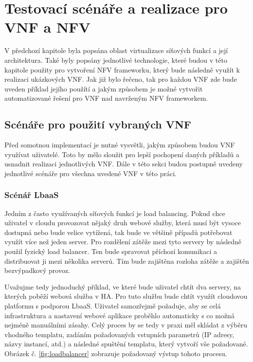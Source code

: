\chapter{Testovací scénáře a realizace pro VNF a NFV}

V předchozí kapitole byla popsána oblast virtualizace síťových funkcí a její architektura. Také byly popsány jednotlivé technologie, které budou v této kapitole použity pro vytvoření NFV frameworku, který bude následně využít k realizaci ukázkových VNF. Jak již bylo řečeno, tak pro každou VNF zde bude uveden příklad jejího použítí a jakým způsobem je možné vytvořit automatizované řešení pro VNF nad navrženým NFV frameworkem.

\section{Scénáře pro použití vybraných VNF}

Před somotnou implementací je nutné vysvětli, jakým způsobem budou VNF využívat uživatelé. Toto by mělo sloužit pro lepší pochopení daných příkladů a usnadnit realizaci jednotlivých VNF. Dále v této sekci budou postupně uvedeny jednotlivé scénáře pro všechna uvedené VNF v této práci. 

\subsection{Scénář LbaaS}

Jedním z často využívaných síťových funkcí je load balancing. Pokud chce uživatel v cloudu provozovat nějaký druh webové služby, která musí být vysoce dostupná nebo bude velice vytížená, tak bude ve většině případů potřebovat využít více než jeden server. Pro rozdělení zátěže mezi tyto servery by následně použil fyzický load balancer. Ten bude spravovat příchozí komunikaci a distribuovat ji mezi několika serverů. Tím bude zajištěna rozloha zátěže a zajištěn bezvýpadkový provoz.

Uvažujme tedy jednoduchý příklad, ve které bude uživatel chtít dva servery, na kterých poběží webová služba v HA. Pro tuto službu bude chtít využít cloudovou platformu s podporou LbaaS. Uživatel samozřejmě požaduje, aby se celá infrastruktura a nastavení webové aplikace proběhlo automaticky s co možná nejméně manuálními zásahy. Celý proces by se tedy v praxi měl skládat z výběru vhodného templatu, zadáním požadovaných vstupních parametrů (IP adresy, názvy instancí, atd.) a následné spuštění templatu, který vytvoří vše požadované. Obrázek č. \ref{fig:loadbalancer} zobrazuje požadovaný výstup tohoto procesu.


